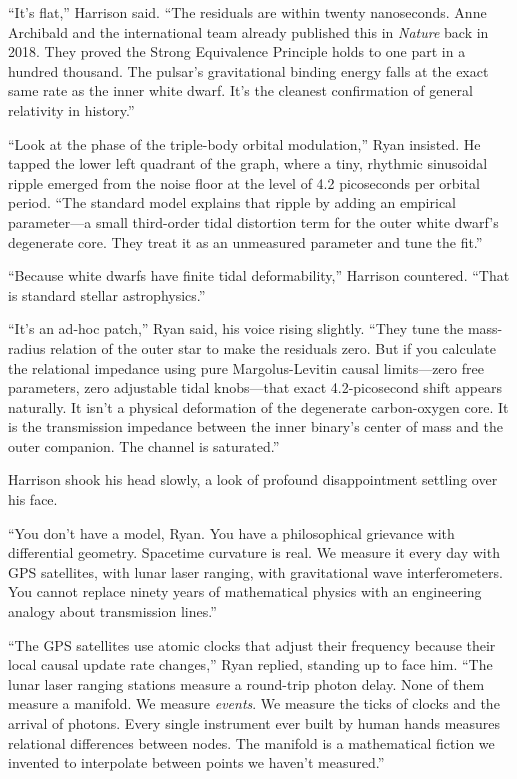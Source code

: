 \documentclass[12pt,twoside,openright]{book}
\begin{document}
``It's flat,'' Harrison said. ``The residuals are within twenty
nanoseconds. Anne Archibald and the international team already published
this in \emph{Nature} back in 2018. They proved the Strong Equivalence
Principle holds to one part in a hundred thousand. The pulsar's
gravitational binding energy falls at the exact same rate as the inner
white dwarf. It's the cleanest confirmation of general relativity in
history.''

``Look at the phase of the triple-body orbital modulation,'' Ryan
insisted. He tapped the lower left quadrant of the graph, where a tiny,
rhythmic sinusoidal ripple emerged from the noise floor at the level of
4.2 picoseconds per orbital period. ``The standard model explains that
ripple by adding an empirical parameter---a small third-order tidal
distortion term for the outer white dwarf's degenerate core. They treat
it as an unmeasured parameter and tune the fit.''

``Because white dwarfs have finite tidal deformability,'' Harrison
countered. ``That is standard stellar astrophysics.''

``It's an ad-hoc patch,'' Ryan said, his voice rising slightly. ``They
tune the mass-radius relation of the outer star to make the residuals
zero. But if you calculate the relational impedance using pure
Margolus-Levitin causal limits---zero free parameters, zero adjustable
tidal knobs---that exact 4.2-picosecond shift appears naturally. It
isn't a physical deformation of the degenerate carbon-oxygen core. It is
the transmission impedance between the inner binary's center of mass and
the outer companion. The channel is saturated.''

Harrison shook his head slowly, a look of profound disappointment
settling over his face.

``You don't have a model, Ryan. You have a philosophical grievance with
differential geometry. Spacetime curvature is real. We measure it every
day with GPS satellites, with lunar laser ranging, with gravitational
wave interferometers. You cannot replace ninety years of mathematical
physics with an engineering analogy about transmission lines.''

``The GPS satellites use atomic clocks that adjust their frequency
because their local causal update rate changes,'' Ryan replied, standing
up to face him. ``The lunar laser ranging stations measure a round-trip
photon delay. None of them measure a manifold. We measure \emph{events}.
We measure the ticks of clocks and the arrival of photons. Every single
instrument ever built by human hands measures relational differences
between nodes. The manifold is a mathematical fiction we invented to
interpolate between points we haven't measured.''
\end{document}
